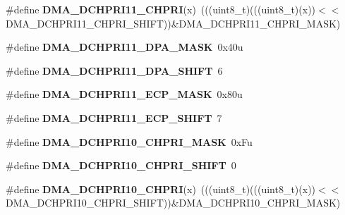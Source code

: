 \begin{DoxyCompactItemize}
\item 
\#define {\bfseries D\+M\+A\+\_\+\+D\+C\+H\+P\+R\+I11\+\_\+\+C\+H\+P\+RI}(x)~(((uint8\+\_\+t)(((uint8\+\_\+t)(x))$<$$<$D\+M\+A\+\_\+\+D\+C\+H\+P\+R\+I11\+\_\+\+C\+H\+P\+R\+I\+\_\+\+S\+H\+I\+FT))\&D\+M\+A\+\_\+\+D\+C\+H\+P\+R\+I11\+\_\+\+C\+H\+P\+R\+I\+\_\+\+M\+A\+SK)\hypertarget{group__DMA__Register__Masks_gaec1d6da6f74d6a49cc3499e451acb9d6}{}\label{group__DMA__Register__Masks_gaec1d6da6f74d6a49cc3499e451acb9d6}

\item 
\#define {\bfseries D\+M\+A\+\_\+\+D\+C\+H\+P\+R\+I11\+\_\+\+D\+P\+A\+\_\+\+M\+A\+SK}~0x40u\hypertarget{group__DMA__Register__Masks_gabd5fcd0b0589ce541af05db3c94cf62e}{}\label{group__DMA__Register__Masks_gabd5fcd0b0589ce541af05db3c94cf62e}

\item 
\#define {\bfseries D\+M\+A\+\_\+\+D\+C\+H\+P\+R\+I11\+\_\+\+D\+P\+A\+\_\+\+S\+H\+I\+FT}~6\hypertarget{group__DMA__Register__Masks_ga9d922595ae26b09e86e4c7a86a0a476f}{}\label{group__DMA__Register__Masks_ga9d922595ae26b09e86e4c7a86a0a476f}

\item 
\#define {\bfseries D\+M\+A\+\_\+\+D\+C\+H\+P\+R\+I11\+\_\+\+E\+C\+P\+\_\+\+M\+A\+SK}~0x80u\hypertarget{group__DMA__Register__Masks_ga0fa3fd877caf7576aa86d45cd74c2f14}{}\label{group__DMA__Register__Masks_ga0fa3fd877caf7576aa86d45cd74c2f14}

\item 
\#define {\bfseries D\+M\+A\+\_\+\+D\+C\+H\+P\+R\+I11\+\_\+\+E\+C\+P\+\_\+\+S\+H\+I\+FT}~7\hypertarget{group__DMA__Register__Masks_gadd7793c7e5fb49aed57108e5fef14683}{}\label{group__DMA__Register__Masks_gadd7793c7e5fb49aed57108e5fef14683}

\item 
\#define {\bfseries D\+M\+A\+\_\+\+D\+C\+H\+P\+R\+I10\+\_\+\+C\+H\+P\+R\+I\+\_\+\+M\+A\+SK}~0x\+Fu\hypertarget{group__DMA__Register__Masks_ga3b501306e4d14b013245e0cc3b4758dc}{}\label{group__DMA__Register__Masks_ga3b501306e4d14b013245e0cc3b4758dc}

\item 
\#define {\bfseries D\+M\+A\+\_\+\+D\+C\+H\+P\+R\+I10\+\_\+\+C\+H\+P\+R\+I\+\_\+\+S\+H\+I\+FT}~0\hypertarget{group__DMA__Register__Masks_ga5932de8a8d3c8b2b657f415258c430d9}{}\label{group__DMA__Register__Masks_ga5932de8a8d3c8b2b657f415258c430d9}

\item 
\#define {\bfseries D\+M\+A\+\_\+\+D\+C\+H\+P\+R\+I10\+\_\+\+C\+H\+P\+RI}(x)~(((uint8\+\_\+t)(((uint8\+\_\+t)(x))$<$$<$D\+M\+A\+\_\+\+D\+C\+H\+P\+R\+I10\+\_\+\+C\+H\+P\+R\+I\+\_\+\+S\+H\+I\+FT))\&D\+M\+A\+\_\+\+D\+C\+H\+P\+R\+I10\+\_\+\+C\+H\+P\+R\+I\+\_\+\+M\+A\+SK)\hypertarget{group__DMA__Register__Masks_ga7ee0614761b3613aab2fce3979145c3a}{}\label{group__DMA__Register__Masks_ga7ee0614761b3613aab2fce3979145c3a}


\end{DoxyCompactItemize}
